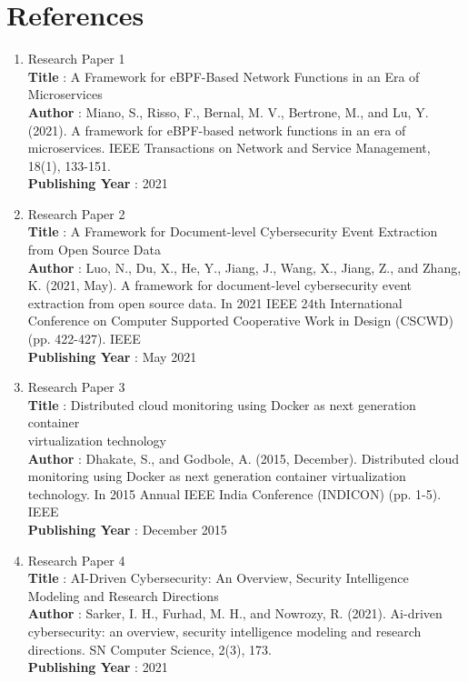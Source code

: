 \chapter*{References}
\begin{enumerate}
\item Research Paper 1 
\\ \textbf{Title} : A Framework for eBPF-Based Network Functions in an Era of Microservices
\\ \textbf{Author} : Miano, S., Risso, F., Bernal, M. V., Bertrone, M., and Lu, Y. (2021). A framework for
eBPF-based network functions in an era of microservices. IEEE Transactions on Network and
Service Management, 18(1), 133-151.
\\ \textbf{Publishing Year} : 2021

\item Research Paper 2
\\ \textbf{Title} : A Framework for Document-level Cybersecurity Event Extraction \\ from Open Source Data
\\ \textbf{Author} :  Luo, N., Du, X., He, Y., Jiang, J., Wang, X., Jiang, Z., and Zhang, K. (2021, May). A
framework for document-level cybersecurity event extraction from open source data. In 2021 IEEE
24th International Conference on Computer Supported Cooperative Work in Design (CSCWD) (pp.
422-427). IEEE
\\ \textbf{Publishing Year} : May 2021

\item Research Paper 3
\\ \textbf{Title} : Distributed cloud monitoring using Docker as next generation container \\ virtualization
technology
\\ \textbf{Author} : Dhakate, S., and Godbole, A. (2015, December). Distributed cloud monitoring using
Docker as next generation container virtualization technology. In 2015 Annual IEEE India
Conference (INDICON) (pp. 1-5). IEEE
\\ \textbf{Publishing Year} : December 2015

\newpage
\item Research Paper 4 
\\ \textbf{Title} : AI-Driven Cybersecurity: An Overview, Security Intelligence Modeling and Research
Directions
\\ \textbf{Author} : Sarker, I. H., Furhad, M. H., and Nowrozy, R. (2021). Ai-driven cybersecurity: an
overview, security intelligence modeling and research directions. SN Computer Science, 2(3), 173.
\\ \textbf{Publishing Year} : 2021


\end{enumerate}
